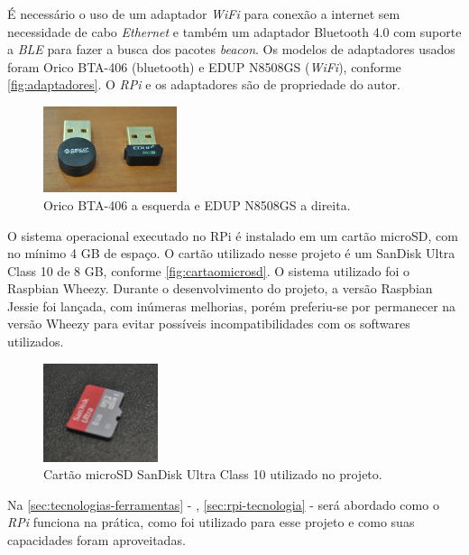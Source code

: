 \documentclass[
		12pt,				%
		openright,			%
		oneside,			%
		a4paper,			%
		chapter=TITLE,		%
		english,			%
		brazil				%
	]{abntex2}
\begin{document}
É necessário o uso de um adaptador \textit{WiFi} para conexão a internet sem necessidade de cabo \textit{Ethernet} e também um adaptador Bluetooth 4.0 com suporte a \textit{BLE} para fazer a busca dos pacotes \textit{beacon}. Os modelos de adaptadores usados foram Orico BTA-406 (bluetooth) e EDUP N8508GS (\textit{WiFi}), conforme \autoref{fig:adaptadores}. O \textit{RPi} e os adaptadores são de propriedade do autor.

\begin{figure}[htb]
	\caption{\label{fig:adaptadores}Orico BTA-406 a esquerda e EDUP N8508GS a direita.}
	\begin{center}
		\includegraphics[width=0.35\textwidth]{img/adaptadores.jpg}
	\end{center}
\end{figure}

O sistema operacional executado no RPi é instalado em um cartão microSD, com no mínimo 4 GB de espaço. O cartão utilizado nesse projeto é um SanDisk Ultra Class 10 de 8 GB, conforme \autoref{fig:cartaomicrosd}. O sistema utilizado foi o Raspbian Wheezy. Durante o desenvolvimento do projeto, a versão Raspbian Jessie foi lançada, com inúmeras melhorias, porém preferiu-se por permanecer na versão Wheezy para evitar possíveis incompatibilidades com os softwares utilizados.

\begin{figure}[htb]
	\caption{\label{fig:cartaomicrosd}Cartão microSD SanDisk Ultra Class 10 utilizado no projeto.}
	\begin{center}
		\includegraphics[width=0.3\textwidth]{img/cartaomicrosd.jpg}
	\end{center}
\end{figure}

Na \autoref{sec:tecnologias-ferramentas} - , \autoref{sec:rpi-tecnologia} -  será abordado como o \textit{RPi} funciona na prática, como foi utilizado para esse projeto e como suas capacidades foram aproveitadas.
\end{document}
